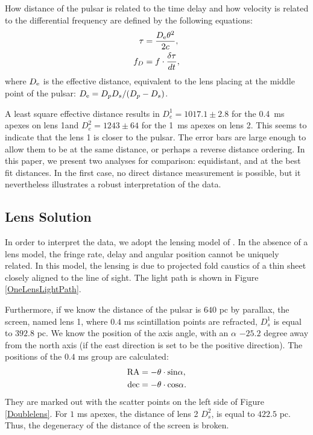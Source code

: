 \documentclass[useAMS,usenatbib]{mn2e}
\begin{document}
How distance of the pulsar is related to the time delay and how velocity is related to the differential frequency are defined by the following equations:
\begin{align*}
\tau &=\frac{D_{\rm e}{\theta}^2}{2c}, \\
f_D  &=f\cdot\frac{\delta\tau}{dt},
\end{align*} 
where ${D_{\rm e}}$ is the effective distance, equivalent to the lens placing at the middle point of the pulsar: $D_{\rm e}={D_p D_s}/({D_p - D_s})$. 

A least square effective distance results in
$D_e^1=1017.1\pm 2.8$ for the  0.4\ ms apexes on lens 1and
$D_e^2 = 1243 \pm 64$ for the 1\ ms apexes on lens 2. This seems to
indicate that the lens 1 is closer to the pulsar. The error
bars are large enough to allow them to be at the same distance, or
perhaps a reverse distance ordering.  In this paper, we present two
analyses for comparison: equidistant, and at the best fit distances.
In the first case, no direct distance measurement is possible, but it
nevertheless illustrates a robust interpretation of the data.


\subsection{Lens Solution}

In order to interpret the data, we adopt the lensing model of
\citet{2014MNRAS.442.3338P}.  In the absence of a lens model, the
fringe rate, delay and angular position cannot be uniquely related. In
this model, the lensing is due to projected fold caustics of a thin
sheet closely aligned to the line of sight. The light path is shown in Figure \ref{OneLensLightPath}.

Furthermore, if we know the distance of the pulsar is $640$ pc by parallax,
the screen, named lens 1, where $0.4$ ms scintillation points are refracted, $D_s^1$ is equal to $392.8$ pc. We know the position of the axis angle, with an $\alpha$ $-25.2$ degree away from the north axis (if the east direction is set to be the positive direction). The positions of the $0.4$ ms group are calculated:
\begin{align*}
{\rm RA}&=-\theta \cdot {\rm sin}\alpha, \\
{\rm dec}&=-\theta \cdot {\rm cos}\alpha.
\end{align*}
They are marked out with the scatter points on the left side of Figure \ref{Doublelens}.
For $1$ ms apexes, the distance of lens 2 $D_s^2$, is equal to $422.5$ pc. Thus, the degeneracy of the distance of the screen is broken.
\end{document}
